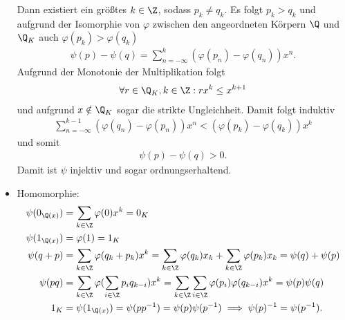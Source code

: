 \begin{solution}
\begin{itemize}
  Dann existiert ein größtes $k \in \Z$, sodass $p_k \neq q_k$. Es folgt $p_k > q_k$ und
  aufgrund der Isomorphie von $\varphi$ zwischen den angeordneten Körpern $\Q$ und $\Q_K$
  auch $\varphi(p_k) > \varphi(q_k)$
  \begin{align*}
    \psi(p) - \psi(q) = \sum_{n = -\infty}^k(\varphi(p_n) - \varphi(q_n))x^n.
  \end{align*}
  Aufgrund der Monotonie der Multiplikation folgt
  \begin{align*}
    \forall r \in \Q_K, k \in \Z: rx^k \leq x^{k+1}
  \end{align*}
  und aufgrund $x \notin \Q_K$ sogar die strikte Ungleichheit.
  Damit folgt induktiv
  \begin{align*}
    \sum_{n = -\infty}^{k - 1} (\varphi(q_n) - \varphi(p_n))x^n < (\varphi(p_k) - \varphi(q_k))x^k
  \end{align*}
  und somit
  \begin{align*}
    \psi(p) - \psi(q) > 0.
  \end{align*}
  Damit ist $\psi$ injektiv und sogar ordnungserhaltend.
  \item Homomorphie:
  \begin{align*}
    \psi(0_{\Q(x)}) &= \sum_{k \in \Z}\varphi(0)x^k = 0_K \\
    \psi(1_{\Q(x)}) &= \varphi(1) = 1_K \\
    \psi(q + p) &= \sum_{k \in \Z}\varphi(q_k + p_k)x^k =
    \sum_{k \in \Z}\varphi(q_k)x_k + \sum_{k \in \Z}\varphi(p_k)x_k
    = \psi(q) + \psi(p) \\
    \psi(pq) &= \sum_{k \in \Z}\varphi(\sum_{i \in \Z}p_iq_{k-i})x^k =
    \sum_{k \in \Z}\sum_{i \in \Z}\varphi(p_i)\varphi(q_{k-i})x^k
    = \psi(p)\psi(q) \\
    1_K &= \psi(1_{\Q(x)}) = \psi(pp^{-1}) = \psi(p)\psi(p^{-1})
    \implies \psi(p)^{-1} = \psi(p^{-1}).
  \end{align*}
\end{itemize}
\end{solution}
